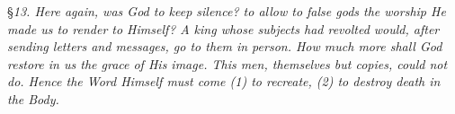 
§\emph{13. Here again, was God to keep silence? to allow to false gods the worship He made us to render to Himself? A king whose subjects had revolted would, after sending letters and messages, go to them in person. How much more shall God restore in us the grace of His image. This men, themselves but copies, could not do. Hence the Word Himself must come (1) to recreate, (2) to destroy death in the Body.}

